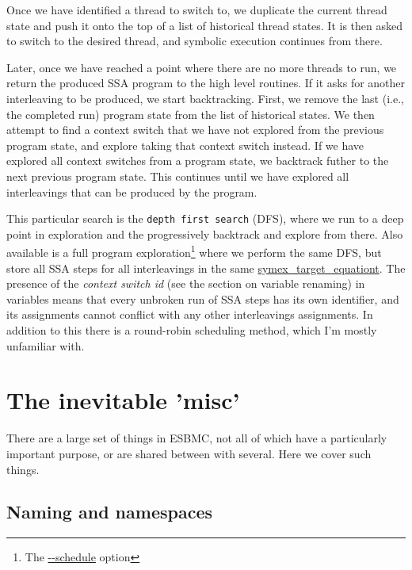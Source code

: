 \documentclass{article}
\begin{document}
Once we have identified a thread to switch to, we duplicate the current thread
state and push it onto the top of a list of historical thread states. It is
then asked to switch to the desired thread, and symbolic execution continues
from there.

Later, once we have reached a point where there are no more threads to run,
we return the produced SSA program to the high level routines. If it asks
for another interleaving to be produced, we start backtracking. First, we remove
the last (i.e., the completed run) program state from the list of historical
states. We then attempt to find a context switch that we have not explored
from the previous program state, and explore taking that context switch instead.
If we have explored all context switches from a program state, we backtrack
futher to the next previous program state. This continues until we have explored
all interleavings that can be produced by the program.

This particular search is the \texttt{depth first search} (DFS), where we run to
a deep point in exploration and the progressively backtrack and explore from
there. Also available is a full program exploration\footnote{The
\url{--schedule} option} where we perform the same DFS, but store all SSA steps
for all interleavings in the same \url{symex_target_equationt}. The presence
of the \textit{context switch id} (see the section on variable renaming) in
variables means that every unbroken run of SSA steps has its own identifier,
and its assignments cannot conflict with any other interleavings assignments.
In addition to this there is a round-robin scheduling method, which I'm mostly
unfamiliar with.

\section{The inevitable 'misc'}

There are a large set of things in ESBMC, not all of which have a particularly
important purpose, or are shared between with several. Here we cover such
things.

\subsection{Naming and namespaces}
\end{document}
